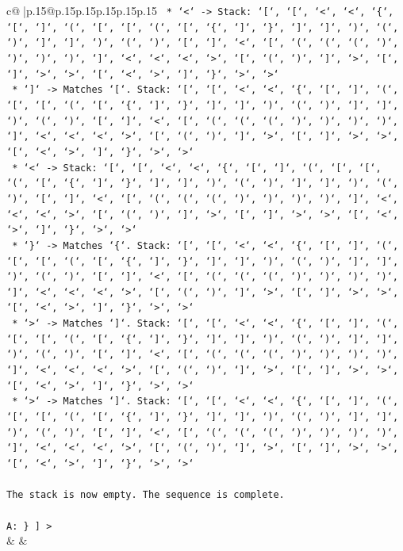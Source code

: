 \documentclass{article}
\begin{document}
{\begin{supertabular}{c@{$\;$}|p{.15\linewidth}@{}p{.15\linewidth}p{.15\linewidth}p{.15\linewidth}p{.15\linewidth}p{.15\linewidth}}
{{{\texttt{    *   `<` {-}> Stack: `{[}`, `{[}`, `<`, `<`, `\{`, `{[}`, `{]}`, `(`, `{[}`, `{[}`, `(`, `{[}`, `\{`, `{]}`, `\}`, `{]}`, `{]}`, `)`, `(`, `)`, `{]}`, `{]}`, `)`, `(`, `)`, `{[}`, `{]}`, `<`, `{[}`, `(`, `(`, `(`, `)`, `)`, `)`, `)`, `{]}`, `<`, `<`, `<`, `>`, `{[}`, `(`, `)`, `{]}`, `>`, `{[}`, `{]}`, `>`, `>`, `{[}`, `<`, `>`, `{]}`, `\}`, `>`, `>`} \\
\texttt{    *   `{]}` {-}> Matches `{[}`. Stack: `{[}`, `{[}`, `<`, `<`, `\{`, `{[}`, `{]}`, `(`, `{[}`, `{[}`, `(`, `{[}`, `\{`, `{]}`, `\}`, `{]}`, `{]}`, `)`, `(`, `)`, `{]}`, `{]}`, `)`, `(`, `)`, `{[}`, `{]}`, `<`, `{[}`, `(`, `(`, `(`, `)`, `)`, `)`, `)`, `{]}`, `<`, `<`, `<`, `>`, `{[}`, `(`, `)`, `{]}`, `>`, `{[}`, `{]}`, `>`, `>`, `{[}`, `<`, `>`, `{]}`, `\}`, `>`, `>`} \\
\texttt{    *   `<` {-}> Stack: `{[}`, `{[}`, `<`, `<`, `\{`, `{[}`, `{]}`, `(`, `{[}`, `{[}`, `(`, `{[}`, `\{`, `{]}`, `\}`, `{]}`, `{]}`, `)`, `(`, `)`, `{]}`, `{]}`, `)`, `(`, `)`, `{[}`, `{]}`, `<`, `{[}`, `(`, `(`, `(`, `)`, `)`, `)`, `)`, `{]}`, `<`, `<`, `<`, `>`, `{[}`, `(`, `)`, `{]}`, `>`, `{[}`, `{]}`, `>`, `>`, `{[}`, `<`, `>`, `{]}`, `\}`, `>`, `>`} \\
\texttt{    *   `\}` {-}> Matches `\{`. Stack: `{[}`, `{[}`, `<`, `<`, `\{`, `{[}`, `{]}`, `(`, `{[}`, `{[}`, `(`, `{[}`, `\{`, `{]}`, `\}`, `{]}`, `{]}`, `)`, `(`, `)`, `{]}`, `{]}`, `)`, `(`, `)`, `{[}`, `{]}`, `<`, `{[}`, `(`, `(`, `(`, `)`, `)`, `)`, `)`, `{]}`, `<`, `<`, `<`, `>`, `{[}`, `(`, `)`, `{]}`, `>`, `{[}`, `{]}`, `>`, `>`, `{[}`, `<`, `>`, `{]}`, `\}`, `>`, `>`} \\
\texttt{    *   `>` {-}> Matches `{]}`. Stack: `{[}`, `{[}`, `<`, `<`, `\{`, `{[}`, `{]}`, `(`, `{[}`, `{[}`, `(`, `{[}`, `\{`, `{]}`, `\}`, `{]}`, `{]}`, `)`, `(`, `)`, `{]}`, `{]}`, `)`, `(`, `)`, `{[}`, `{]}`, `<`, `{[}`, `(`, `(`, `(`, `)`, `)`, `)`, `)`, `{]}`, `<`, `<`, `<`, `>`, `{[}`, `(`, `)`, `{]}`, `>`, `{[}`, `{]}`, `>`, `>`, `{[}`, `<`, `>`, `{]}`, `\}`, `>`, `>`} \\
\texttt{    *   `>` {-}> Matches `{]}`. Stack: `{[}`, `{[}`, `<`, `<`, `\{`, `{[}`, `{]}`, `(`, `{[}`, `{[}`, `(`, `{[}`, `\{`, `{]}`, `\}`, `{]}`, `{]}`, `)`, `(`, `)`, `{]}`, `{]}`, `)`, `(`, `)`, `{[}`, `{]}`, `<`, `{[}`, `(`, `(`, `(`, `)`, `)`, `)`, `)`, `{]}`, `<`, `<`, `<`, `>`, `{[}`, `(`, `)`, `{]}`, `>`, `{[}`, `{]}`, `>`, `>`, `{[}`, `<`, `>`, `{]}`, `\}`, `>`, `>`} \\
\\ 
\texttt{The stack is now empty. The sequence is complete.} \\
\\ 
\texttt{A: \} {]} >} \\
            }
        }
    }
    & & \\ \\


\end{supertabular}}
\end{document}
